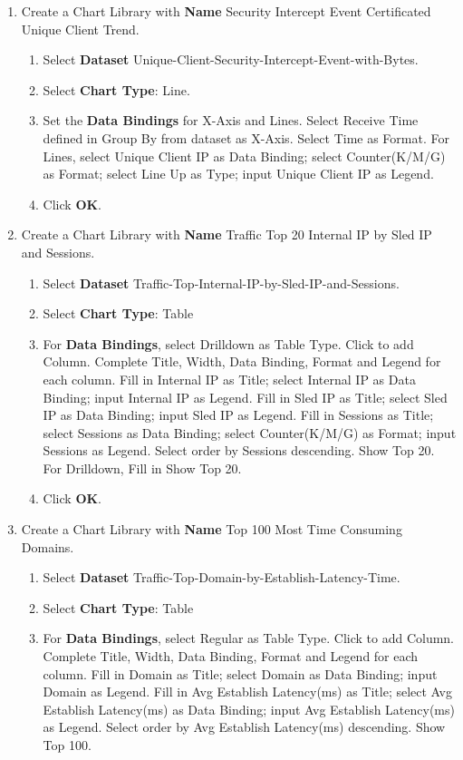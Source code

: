 \begin{description}
\begin{enumerate}
\begin{enumerate}
        \end{enumerate}
        \item 	Create a Chart Library with \textbf{Name} Security Intercept Event Certificated Unique Client Trend.
        \begin{enumerate}
            \item	Select \textbf{Dataset} Unique-Client-Security-Intercept-Event-with-Bytes.
            \item	Select \textbf{Chart Type}: Line.
            \item	Set the \textbf{Data Bindings} for X-Axis and Lines. Select Receive Time defined in Group By from dataset as X-Axis. Select Time as Format. For Lines, select Unique Client IP as Data Binding; select Counter(K/M/G) as Format; select Line Up as Type; input Unique Client IP as Legend. 
            \item	Click \textbf{OK}.
        \end{enumerate}
        \item 	Create a Chart Library with \textbf{Name} Traffic Top 20 Internal IP by Sled IP and Sessions.  
        \begin{enumerate}
            \item	Select \textbf{Dataset} Traffic-Top-Internal-IP-by-Sled-IP-and-Sessions.
            \item	Select \textbf{Chart Type}: Table
            \item	For \textbf{Data Bindings}, select Drilldown as Table Type. Click to add Column. Complete Title, Width, Data Binding, Format and Legend for each column. Fill in Internal IP as Title; select Internal IP as Data Binding; input Internal IP as Legend. Fill in Sled IP as Title; select Sled IP as Data Binding; input Sled IP as Legend. Fill in Sessions as Title; select Sessions as Data Binding; select Counter(K/M/G) as Format; input Sessions as Legend. Select order by Sessions descending. Show Top 20. For Drilldown, Fill in Show Top 20. 
            \item	Click \textbf{OK}.
        \end{enumerate}    
        \item 	Create a Chart Library with \textbf{Name} Top 100 Most Time Consuming Domains. 
        \begin{enumerate}
            \item 	Select \textbf{Dataset} Traffic-Top-Domain-by-Establish-Latency-Time.
            \item 	Select \textbf{Chart Type}: Table
            \item 	For \textbf{Data Bindings}, select Regular as Table Type. Click to add Column. Complete Title, Width, Data Binding, Format and Legend for each column. Fill in Domain as Title; select Domain as Data Binding; input Domain as Legend. Fill in Avg Establish Latency(ms) as Title; select Avg Establish Latency(ms) as Data Binding; input Avg Establish Latency(ms) as Legend. Select order by Avg Establish Latency(ms) descending. Show Top 100. 

\end{enumerate}
\end{enumerate}
\end{description}
